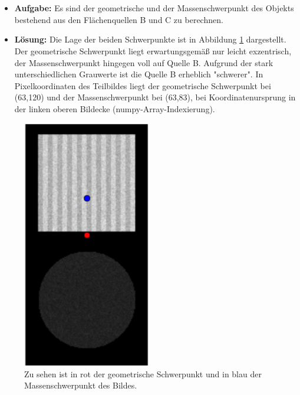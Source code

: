 \documentclass[12pt, a4paper, twoside]{report}
\begin{document}
\section{}
\begin{itemize}
\item \textbf{Aufgabe:} Es sind der geometrische und der Massenschwerpunkt des Objekts bestehend aus den Flächenquellen B und C zu berechnen.
\item \textbf{Lösung:} Die Lage der beiden Schwerpunkte ist in Abbildung \ref{schwerpunkt} dargestellt. Der geometrische Schwerpunkt liegt erwartungsgemäß nur leicht exzentrisch, der Massenschwerpunkt hingegen voll auf Quelle B. Aufgrund der stark unterschiedlichen Grauwerte ist die Quelle B erheblich "schwerer". In Pixelkoordinaten des Teilbildes liegt der geometrische Schwerpunkt bei (63,120) und der Massenschwerpunkt bei (63,83), bei Koordinatenursprung in der linken oberen Bildecke (numpy-Array-Indexierung).
\end{itemize}

\begin{figure}[h]
\centering
\includegraphics[width=0.5\textwidth]{../bilder/schwerpunkte.png}
\caption{Zu sehen ist in rot der geometrische Schwerpunkt und in blau der Massenschwerpunkt des Bildes.}
\label{schwerpunkt}
\end{figure}
\end{document}
